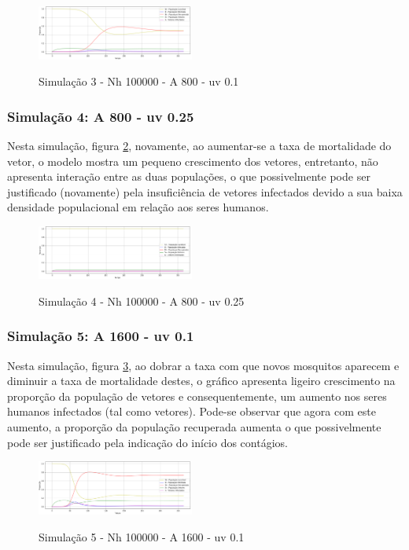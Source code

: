 \documentclass[conference]{IEEEtran}
\begin{document}
\begin{figure}[!ht]
  \caption{Simulação 3 - Nh 100000 - A 800 - uv 0.1}
  \includegraphics[width=0.46\textwidth]{Graf3.png}
    \label{fig:s3}
\end{figure}

\subsubsection{Simulação 4: A 800 - uv 0.25}

Nesta simulação, figura \ref{fig:s4}, novamente, ao aumentar-se a taxa de mortalidade do vetor, o modelo mostra um pequeno crescimento dos vetores, entretanto, não apresenta interação entre as duas populações, o que possivelmente pode ser justificado (novamente) pela insuficiência  de vetores infectados devido a sua baixa densidade populacional em relação aos seres humanos.
\\

\begin{figure}[!ht]
  \caption{Simulação 4 - Nh 100000 - A 800 - uv 0.25}
  \includegraphics[width=0.46\textwidth]{Graf4.png}
  \label{fig:s4}
\end{figure}

\subsubsection{Simulação 5: A 1600 - uv 0.1}

Nesta simulação, figura \ref{fig:s5}, ao dobrar a taxa com que novos mosquitos aparecem e diminuir a taxa de mortalidade destes, o gráfico apresenta ligeiro crescimento na proporção da população de vetores e consequentemente, um aumento nos seres humanos infectados (tal como vetores). Pode-se observar que agora com este aumento, a proporção da população recuperada aumenta o que possivelmente pode ser justificado pela indicação do início dos contágios.
\\

\begin{figure}[!ht]
  \caption{Simulação 5 - Nh 100000 - A 1600 - uv 0.1}
  \includegraphics[width=0.46\textwidth]{Graf5.png}
  \label{fig:s5}
\end{figure}
\end{document}
